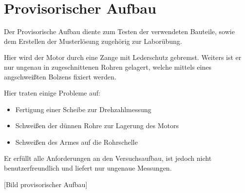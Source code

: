 \section{Provisorischer Aufbau}
\label{provi}

Der Provisorische Aufbau diente zum Testen der verwendeten Bauteile, sowie dem Erstellen der Musterlösung zugehörig zur Laborübung.

Hier wird der Motor durch eine Zange mit Lederschutz gebremst.
Weiters ist er nur ungenau in zugeschnittenen Rohren gelagert, welche mittels eines angschweißten Bolzens fixiert werden.

Hier traten einige Probleme auf:

\begin{itemize}
    \item Fertigung einer Scheibe zur Drehzahlmessung
    \item Schweißen der dünnen Rohre zur Lagerung des Motors
    \item Schweißen des Armes auf die Rohrschelle
\end{itemize}

Er erfüllt alle Anforderungen an den Versuchsaufbau, ist jedoch nicht benutzerfreundlich und liefert nur ungenaue Messungen.

[Bild provisorischer Aufbau]